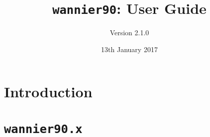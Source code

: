 \documentclass[a4paper,11pt,twoside]{book}
\title{{\tt wannier90}: User Guide}
\author{Version 2.1.0}
\date{13th January 2017}
\begin{document}
\newcommand{\wannier}{\texttt{wannier90}}
\newcommand{\postw}{\texttt{postw90}}
\newcommand{\bw}{\texttt{BoltzWann}}
\newcommand{\pwscf}{\textsc{pwscf}}
\newcommand{\QE}{\textsc{quantum-espresso}}
\newcommand{\Mkb}{\mathbf{M}^{(\mathbf{k},\mathbf{b})}}
\newcommand{\Ak}{\mathbf{A}^{(\mathbf{k})}}
\newcommand{\Uk}{\mathbf{U}^{(\mathbf{k})}}
\newcommand{\cond}{\item[$\star$]}
\newcommand{\omi}{\Omega_{\mathrm{I}}}
\newcommand{\omt}{\widetilde{\Omega}}
\newcommand{\bvec}[1]{\bm{\mathrm{#1}}}


\def\nn{\nonumber\\}
\def\dk{[d\kk]}
\def\im{{\rm Im}}
\def\re{{\rm Re}}
\def\tr{{\rm Tr}}
\def\beq{\begin{equation}}
\def\eeq{\end{equation}}
\def\bea{\begin{eqnarray}}
\def\eea{\end{eqnarray}}
\def\ket#1{\vert#1\rangle}
\def\bra#1{\langle#1\vert}
\def\ip#1#2{\langle#1\vert#2\rangle}
\def\me#1#2#3{\langle#1\vert#2\vert#3\rangle}
\def\wt#1{\widetilde{#1}}
\def\kpar{{\boldsymbol\kappa}}
\def\T{\mathcal T}
\def\P{\mathcal P}
\def\ww{\omega}
\def\kk{{\bm k}}
\def\KK{{\bm K}}
\def\kz{K_z}
\def\qq{{\bm q}}
\def\rr{{\bm r}}
\def\RR{{\bm R}}
\def\GG{{\bm G}}
\def\EE{{\bm E}}
\def\BB{{\bm B}}
\def\MM{{\bm M}}
\def\jj{{\bm j}}
\def\E{{\mathcal E}}
\def\bE{{\bm{\mathcal E}}}
\def\ee{\hat{\bm e}}
\def\eps{\epsilon}
\def\vareps{\varepsilon}
\def\alfa{{\mathfrak a}}
\newcommand{\eq}[1]{Eq.~(\ref{eq:#1})}
\newcommand{\eqs}[2]{Eqs.~(\ref{eq:#1}) and~(\ref{eq:#2})}





\maketitle


\tableofcontents



\part{Introduction}



\part{\texttt{wannier90.x}\label{part:w90}}
\end{document}
